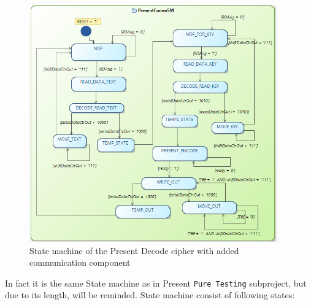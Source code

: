 \documentclass{gajewski}
\begin{document}
\begin{figure}[!ht]%
    \begin{center}
    \includegraphics[width=0.95\textwidth]{img/presentDecodeCommSM.png}
    \caption{%
        State machine of the Present Decode cipher with added communication component
     }%
    \label{presentDecodeCommSM}
    \end{center}
 \end{figure}


In fact it is the same State machine as in Present \texttt{Pure Testing} subproject, but due to its length, will be reminded. State machine consist of following states:
\end{document}

